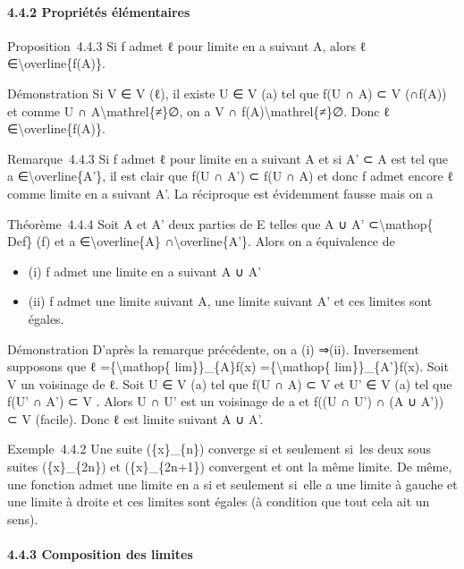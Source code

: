 \documentclass[]{article}
\begin{document}
\paragraph{4.4.2 Propriétés élémentaires}

Proposition~4.4.3 Si f admet ℓ pour limite en a suivant A, alors ℓ
∈\textbackslash{}overline\{f(A)\}.

Démonstration Si V ∈ V (ℓ), il existe U ∈ V (a) tel que f(U ∩ A) ⊂ V
(∩f(A)) et comme U ∩ A\textbackslash{}mathrel\{≠\}∅, on a V ∩
f(A)\textbackslash{}mathrel\{≠\}∅. Donc ℓ
∈\textbackslash{}overline\{f(A)\}.

Remarque~4.4.3 Si f admet ℓ pour limite en a suivant A et si A' ⊂ A est
tel que a ∈\textbackslash{}overline\{A'\}, il est clair que f(U ∩ A') ⊂
f(U ∩ A) et donc f admet encore ℓ comme limite en a suivant A'. La
réciproque est évidemment fausse mais on a

Théorème~4.4.4 Soit A et A' deux parties de E telles que A ∪ A'
⊂\textbackslash{}mathop\{ Def\} (f) et a ∈\textbackslash{}overline\{A\}
∩\textbackslash{}overline\{A'\}. Alors on a équivalence de

\begin{itemize}
\itemsep1pt\parskip0pt
\item
  (i) f admet une limite en a suivant A ∪ A'
\item
  (ii) f admet une limite suivant A, une limite suivant A' et ces
  limites sont égales.
\end{itemize}

Démonstration D'après la remarque précédente, on a (i) ⇒(ii).
Inversement supposons que ℓ =\{\textbackslash{}mathop\{
lim\}\}\_\{A\}f(x) =\{\textbackslash{}mathop\{ lim\}\}\_\{A'\}f(x). Soit
V un voisinage de ℓ. Soit U ∈ V (a) tel que f(U ∩ A) ⊂ V et U' ∈ V (a)
tel que f(U' ∩ A') ⊂ V . Alors U ∩ U' est un voisinage de a et f((U ∩
U') ∩ (A ∪ A')) ⊂ V (facile). Donc ℓ est limite suivant A ∪ A'.

Exemple~4.4.2 Une suite (\{x\}\_\{n\}) converge si et seulement si~les
deux sous suites (\{x\}\_\{2n\}) et (\{x\}\_\{2n+1\}) convergent et ont
la même limite. De même, une fonction admet une limite en a si et
seulement si~elle a une limite à gauche et une limite à droite et ces
limites sont égales (à condition que tout cela ait un sens).

\paragraph{4.4.3 Composition des limites}
\end{document}
